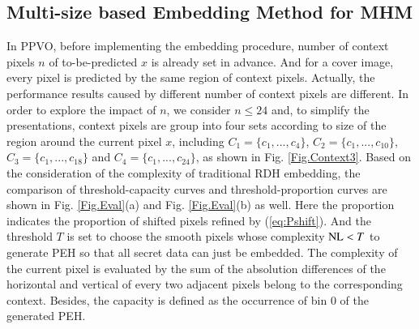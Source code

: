\documentclass[review,3p,10pt,sort&compress]{elsarticle}
\begin{document}
\subsection{Multi-size based Embedding Method for MHM}\label{sec:3.2}
In PPVO, before implementing the embedding procedure, number of context pixels $n$ of to-be-predicted $x$ is already set in advance. And for a cover image, every pixel is predicted by the same region of context pixels. Actually, the performance results caused by different number of context pixels are different. In order to explore the impact of $n$, we consider $n \leq 24$ and, to simplify the presentations, context pixels are group into four sets according to size of the region around the current pixel $x$, including $C_1 = \{c_1, ..., c_4\}$, $C_2 = \{c_1, ..., c_{10}\}$, $C_3 = \{c_1, ..., c_{18}\}$ and $C_4 = \{c_1, ..., c_{24}\}$, as shown in Fig. \ref{Fig.Context3}. Based on the consideration of the complexity of traditional RDH embedding, the comparison of threshold-capacity curves and threshold-proportion curves are shown in Fig. \ref{Fig.Eval}(a) and Fig. \ref{Fig.Eval}(b) as well.
Here the proportion indicates the proportion of shifted pixels refined by (\ref{eq:Pshift}). And the threshold $T$ is set to choose the smooth pixels whose complexity ${\rm NL} < T$ to generate PEH so that all secret data can just be embedded. The complexity of the current pixel is evaluated by the sum of the absolution differences of the horizontal and vertical of every two adjacent pixels belong to the corresponding context. Besides, the capacity is defined as the occurrence of bin 0 of the generated PEH.
\end{document}
